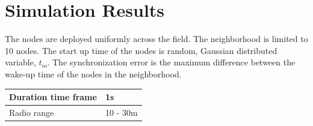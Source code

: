 \documentclass[a4paper,10pt]{report}
\begin{document}
\section{\textbf{Simulation Results}}
The nodes are deployed uniformly across the field. The neighborhood is limited to 10 nodes. The start up time of the nodes is random, Gaussian distributed variable, $t_{io}$. The synchronization error is the maximum difference between the wake-up time of the nodes in the neighborhood.
\newline
\begin{center}
    \begin{tabular}{ | l | l |}
    \hline
    Duration time frame & 1s \\ \hline
    Radio range & 10 - 30m \\ \hline
    \end{tabular}
\end{center}
\end{document}
